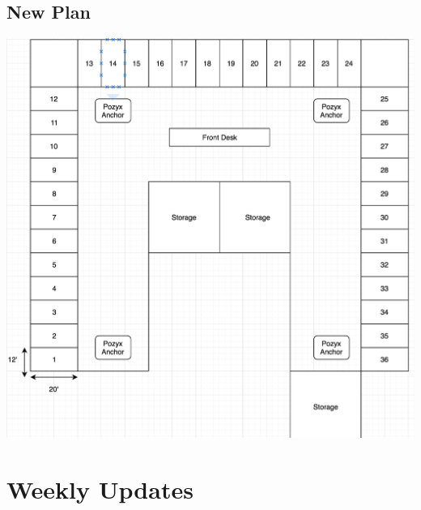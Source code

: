 \documentclass[12pt]{article}
\begin{document}
	\subsection{New Plan}
		\begin{center}
			\includegraphics[scale=0.6]{np.png}\\
		\end{center}

\section{Weekly Updates}
\end{document}
